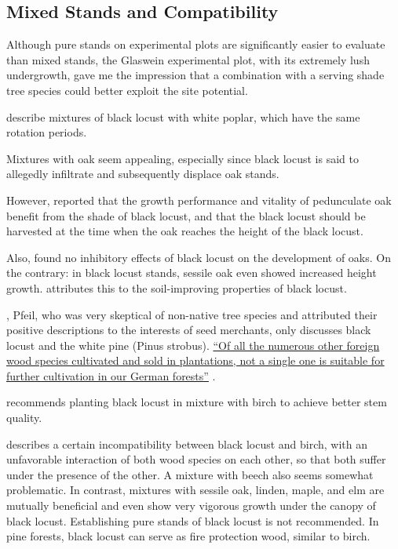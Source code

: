 \subsection{Mixed Stands and Compatibility}

Although pure stands on experimental plots are significantly easier to evaluate than mixed stands, the Glaswein experimental plot, with its extremely lush undergrowth, gave me the impression that a combination with a serving shade tree species could better exploit the site potential.

\citet{redei2006robiniePappel} describe mixtures of black locust with white poplar, which have the same rotation periods.

Mixtures with oak seem appealing, especially since black locust is said to allegedly infiltrate and subsequently displace oak stands.

However, \citet{kallina1888robinie} reported that the growth performance and vitality of pedunculate oak benefit from the shade of black locust, and that the black locust should be harvested at the time when the oak reaches the height of the black locust.

Also, \citet{feher2024robinie} found no inhibitory effects of black locust on the development of oaks. On the contrary: in black locust stands, sessile oak even showed increased height growth. \citet{foeldes1903robinie} attributes this to the soil-improving properties of black locust.

\citet[p.~174ff]{pfeil1829deutscheWaldbaeume}, Pfeil, who was very skeptical of non-native tree species and attributed their positive descriptions to the interests of seed merchants, only discusses black locust and the white pine (Pinus strobus). \hyperlink{german:pfeil1860holzzucht}{\enquote{Of all the numerous other foreign wood species cultivated and sold in plantations, not a single one is suitable for further cultivation in our German forests}} \citep[own translation]{pfeil1860holzzucht}.

\citet{pfeil1850robinie} recommends planting black locust in mixture with birch to achieve better stem quality.

\citet[p.~88–96]{erteld1952robinieErtrag} describes a certain incompatibility between black locust and birch, with an unfavorable interaction of both wood species on each other, so that both suffer under the presence of the other. A mixture with beech also seems somewhat problematic. In contrast, mixtures with sessile oak, linden, maple, and elm are mutually beneficial and even show very vigorous growth under the canopy of black locust. Establishing pure stands of black locust is not recommended. In pine forests, black locust can serve as fire protection wood, similar to birch.

